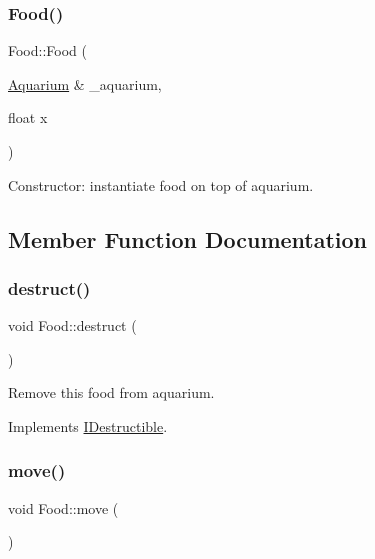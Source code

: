 \subsubsection{\texorpdfstring{Food()}{Food()}}
{\footnotesize\ttfamily Food\+::\+Food (\begin{DoxyParamCaption}\item[{\mbox{\hyperlink{class_aquarium}{Aquarium}} \&}]{\+\_\+aquarium,  }\item[{float}]{x }\end{DoxyParamCaption})}



Constructor\+: instantiate food on top of aquarium. 



\subsection{Member Function Documentation}
\mbox{\label{class_food_a5e1bfe34f8a4f4ce60accc57212c95c8}} 
\subsubsection{\texorpdfstring{destruct()}{destruct()}}
{\footnotesize\ttfamily void Food\+::destruct (\begin{DoxyParamCaption}{ }\end{DoxyParamCaption})\hspace{0.3cm}{\ttfamily [virtual]}}



Remove this food from aquarium. 



Implements \mbox{\hyperlink{class_i_destructible_a63016d1bb4daa0a726fc8add9a0be62d}{I\+Destructible}}.

\mbox{\label{class_food_afb37f87b673df87697665ae82b6da0da}} 
\subsubsection{\texorpdfstring{move()}{move()}}
{\footnotesize\ttfamily void Food\+::move (\begin{DoxyParamCaption}{ }\end{DoxyParamCaption})\hspace{0.3cm}{\ttfamily [virtual]}}



